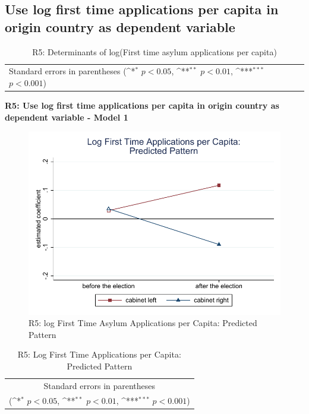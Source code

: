 \documentclass[10pt,a4paper]{scrartcl}
\begin{document}


\clearpage
\FloatBarrier
\subsection{Use log first time applications per capita in origin country as dependent variable}
\begin{table}[!ht]\centering
	\renewcommand{\arraystretch}{1.25}
	\small
	\def\sym#1{\ifmmode^{#1}\else\(^{#1}\)\fi}
	\caption{R5: Determinants of log(First time asylum applications per capita)}
	\begin{tabular}{l*{3}{c}}
		\hline\hline
		
		\hline\hline
		\multicolumn{4}{l}{\footnotesize Standard errors in parentheses (\sym{*} \(p<0.05\), \sym{**} \(p<0.01\), \sym{***} \(p<0.001\))}\\
	\end{tabular}
\end{table}

\clearpage
\textbf{R5: Use log first time applications per capita in origin country as dependent variable - Model 1}
\begin{figure}[!ht]
	\centering
	\includegraphics[width=1\textwidth]{figures_edited/app_graph1_R5.pdf}
	\caption{R5: log First Time Asylum Applications per Capita: Predicted Pattern}
\end{figure}

\begin{table}[!ht]\centering
	\renewcommand{\arraystretch}{1.25}
	\def\sym#1{\ifmmode^{#1}\else\(^{#1}\)\fi}
	\caption{R5: Log First Time Applications per Capita: Predicted Pattern}
	\begin{tabular}{l*{2}{c}}
		\hline\hline
		
		\hline\hline
		\multicolumn{3}{c}{\footnotesize Standard errors in parentheses} \\
		\multicolumn{3}{c}{\footnotesize (\sym{*} \(p<0.05\), \sym{**} \(p<0.01\), \sym{***} \(p<0.001\))}\\
	\end{tabular}
\end{table}
\end{document}

